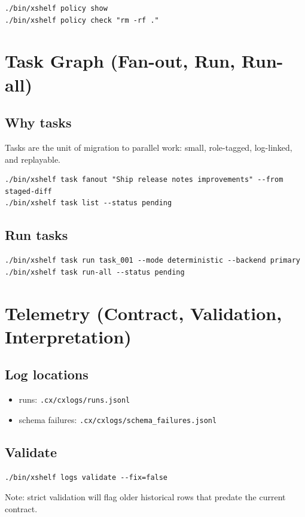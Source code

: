 \documentclass[11pt]{article}
\begin{document}
\begin{lstlisting}[style=cx]
./bin/xshelf policy show
./bin/xshelf policy check "rm -rf ."
\end{lstlisting}

\section{Task Graph (Fan-out, Run, Run-all)}
\subsection{Why tasks}
Tasks are the unit of migration to parallel work: small, role-tagged, log-linked, and replayable.

\begin{lstlisting}[style=cx]
./bin/xshelf task fanout "Ship release notes improvements" --from staged-diff
./bin/xshelf task list --status pending
\end{lstlisting}

\subsection{Run tasks}
\begin{lstlisting}[style=cx]
./bin/xshelf task run task_001 --mode deterministic --backend primary
./bin/xshelf task run-all --status pending
\end{lstlisting}

\section{Telemetry (Contract, Validation, Interpretation)}
\subsection{Log locations}
\begin{itemize}
  \item runs: \texttt{.cx/cxlogs/runs.jsonl}
  \item schema failures: \texttt{.cx/cxlogs/schema\_failures.jsonl}
\end{itemize}

\subsection{Validate}
\begin{lstlisting}[style=cx]
./bin/xshelf logs validate --fix=false
\end{lstlisting}
Note: strict validation will flag older historical rows that predate the current contract.
\end{document}
